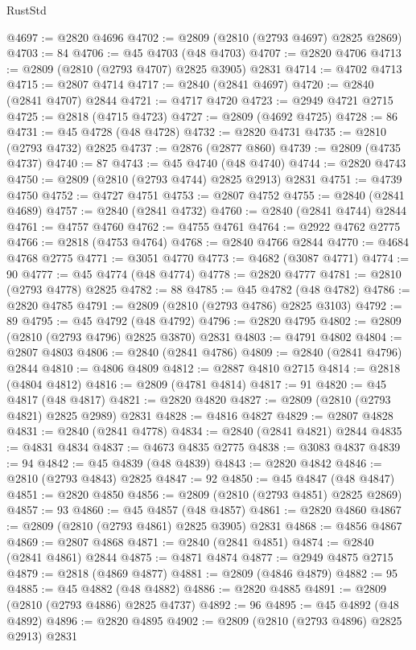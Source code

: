 \begin{lexlean}{RustStd}
\begin{coremodule}
@4697 := @2820 @4696
@4702 := @2809 (@2810 (@2793 @4697) @2825 @2869)
@4703 := 84
@4706 := @45 @4703 (@48 @4703)
@4707 := @2820 @4706
@4713 := @2809 (@2810 (@2793 @4707) @2825 @3905) @2831
@4714 := @4702 @4713
@4715 := @2807 @4714
@4717 := @2840 (@2841 @4697)
@4720 := @2840 (@2841 @4707) @2844
@4721 := @4717 @4720
@4723 := @2949 @4721 @2715
@4725 := @2818 (@4715 @4723)
@4727 := @2809 (@4692 @4725)
@4728 := 86
@4731 := @45 @4728 (@48 @4728)
@4732 := @2820 @4731
@4735 := @2810 (@2793 @4732) @2825
@4737 := @2876 (@2877 @860)
@4739 := @2809 (@4735 @4737)
@4740 := 87
@4743 := @45 @4740 (@48 @4740)
@4744 := @2820 @4743
@4750 := @2809 (@2810 (@2793 @4744) @2825 @2913) @2831
@4751 := @4739 @4750
@4752 := @4727 @4751
@4753 := @2807 @4752
@4755 := @2840 (@2841 @4689)
@4757 := @2840 (@2841 @4732)
@4760 := @2840 (@2841 @4744) @2844
@4761 := @4757 @4760
@4762 := @4755 @4761
@4764 := @2922 @4762 @2775
@4766 := @2818 (@4753 @4764)
@4768 := @2840 @4766 @2844
@4770 := @4684 @4768 @2775
@4771 := @3051 @4770
@4773 := @4682 (@3087 @4771)
@4774 := 90
@4777 := @45 @4774 (@48 @4774)
@4778 := @2820 @4777
@4781 := @2810 (@2793 @4778) @2825
@4782 := 88
@4785 := @45 @4782 (@48 @4782)
@4786 := @2820 @4785
@4791 := @2809 (@2810 (@2793 @4786) @2825 @3103)
@4792 := 89
@4795 := @45 @4792 (@48 @4792)
@4796 := @2820 @4795
@4802 := @2809 (@2810 (@2793 @4796) @2825 @3870) @2831
@4803 := @4791 @4802
@4804 := @2807 @4803
@4806 := @2840 (@2841 @4786)
@4809 := @2840 (@2841 @4796) @2844
@4810 := @4806 @4809
@4812 := @2887 @4810 @2715
@4814 := @2818 (@4804 @4812)
@4816 := @2809 (@4781 @4814)
@4817 := 91
@4820 := @45 @4817 (@48 @4817)
@4821 := @2820 @4820
@4827 := @2809 (@2810 (@2793 @4821) @2825 @2989) @2831
@4828 := @4816 @4827
@4829 := @2807 @4828
@4831 := @2840 (@2841 @4778)
@4834 := @2840 (@2841 @4821) @2844
@4835 := @4831 @4834
@4837 := @4673 @4835 @2775
@4838 := @3083 @4837
@4839 := 94
@4842 := @45 @4839 (@48 @4839)
@4843 := @2820 @4842
@4846 := @2810 (@2793 @4843) @2825
@4847 := 92
@4850 := @45 @4847 (@48 @4847)
@4851 := @2820 @4850
@4856 := @2809 (@2810 (@2793 @4851) @2825 @2869)
@4857 := 93
@4860 := @45 @4857 (@48 @4857)
@4861 := @2820 @4860
@4867 := @2809 (@2810 (@2793 @4861) @2825 @3905) @2831
@4868 := @4856 @4867
@4869 := @2807 @4868
@4871 := @2840 (@2841 @4851)
@4874 := @2840 (@2841 @4861) @2844
@4875 := @4871 @4874
@4877 := @2949 @4875 @2715
@4879 := @2818 (@4869 @4877)
@4881 := @2809 (@4846 @4879)
@4882 := 95
@4885 := @45 @4882 (@48 @4882)
@4886 := @2820 @4885
@4891 := @2809 (@2810 (@2793 @4886) @2825 @4737)
@4892 := 96
@4895 := @45 @4892 (@48 @4892)
@4896 := @2820 @4895
@4902 := @2809 (@2810 (@2793 @4896) @2825 @2913) @2831

\end{coremodule}
\end{lexlean}
